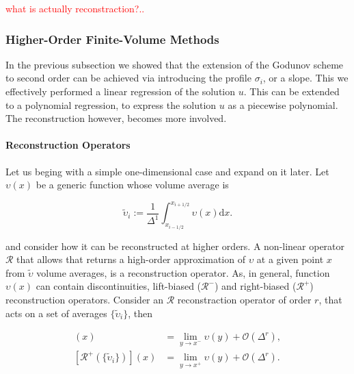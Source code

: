 \documentclass[11pt,a4paper,headinclude=true,DIV=14,BCOR=8mm,chapterprefix,listof=totoc,twoside,openright,abstracton]{scrbook}
\begin{document}
\textcolor{red}{what is actually reconstraction?..}

\subsubsection{Higher-Order Finite-Volume Methods}

In the previous subsection we showed that the extension of the Godunov scheme to second order can be achieved via introducing the profile $\sigma_i$, or a slope. This we effectively performed a linear regression of the solution $u$. This can be extended to a polynomial regression, to express the solution $u$ as a piecewise polynomial. The reconstruction however, becomes more involved.

\paragraph{Reconstruction Operators}

Let us beging with a simple one-dimensional case and expand on it later. Let $\upsilon(x)$ be a generic function whose volume average is 

\begin{equation}
    \widetilde{\upsilon}_i := \frac{1}{\Delta^1}\int_{x_{i-1/2}}^{x_{i+1/2}}\upsilon(x)\text{d}x.
\end{equation}

and consider how it can be reconstructed at higher orders. A non-linear operator  $\mathcal{R}$ that allows that returns a high-order approximation of $\upsilon$ at a given point $x$ from $\widetilde{\upsilon}$ volume averages, is a reconstruction operator. As, in general, function $\upsilon(x)$ can contain discontinuities, lift-biased ($\mathcal{R}^-$) and right-biased ($\mathcal{R}^+$) reconstruction operators. Consider an $\mathcal{R}$ reconstraction operator of order $r$, that acts on a set of averages $\{\widetilde{\upsilon}_i\}$, then

\begin{align}
    [\mathcal{R}^{-}(\{\widetilde{\upsilon}_{i}\})](x) &= \lim_{y\rightarrow x^{-}} \upsilon(y) + \mathcal{O}(\Delta^r), \\
    [\mathcal{R}^{+}(\{\widetilde{\upsilon}_{i}\})](x) &= \lim_{y\rightarrow x^{+}} \upsilon(y) + \mathcal{O}(\Delta^r).
\end{align}
\end{document}
